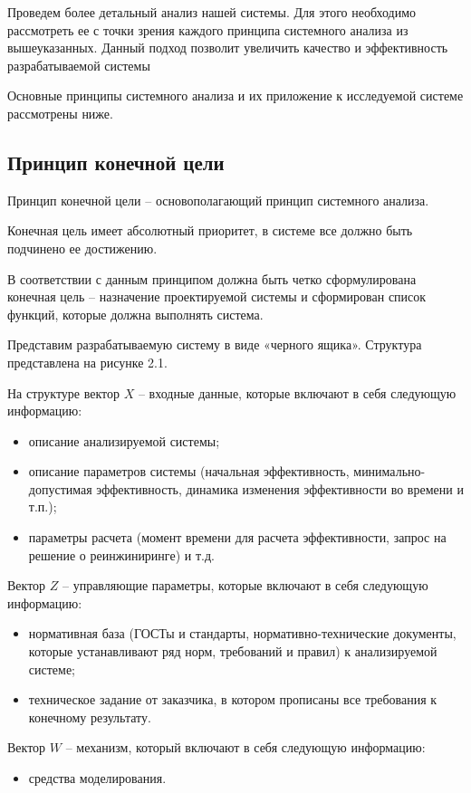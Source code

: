 Проведем более детальный анализ нашей системы. 
Для этого необходимо рассмотреть ее с точки зрения каждого принципа системного анализа из вышеуказанных. 
Данный подход позволит увеличить качество и эффективность разрабатываемой системы

Основные принципы системного анализа и их приложение к исследуемой системе рассмотрены ниже.

\subsection{Принцип конечной цели}
Принцип конечной цели – основополагающий принцип системного анализа.

Конечная цель имеет абсолютный приоритет, в системе все должно быть подчинено ее достижению. 

В соответствии с данным принципом должна быть четко сформулирована конечная цель – назначение проектируемой системы и сформирован список функций, которые должна выполнять система.

Представим разрабатываемую систему в виде «черного ящика». 
Структура представлена на рисунке 2.1.

На структуре вектор $X$ – входные данные, которые включают в себя следующую информацию:
\begin{itemize}
    \item описание анализируемой системы;
    \item описание параметров системы (начальная эффективность, минимально-допустимая эффективность, динамика изменения эффективности во времени и т.п.);
    \item параметры расчета (момент времени для расчета эффективности, запрос на решение о реинжиниринге) и т.д.
\end{itemize}

Вектор $Z$ – управляющие параметры, которые включают в себя следующую информацию:
\begin{itemize}
    \item нормативная база (ГОСТы и стандарты, нормативно-технические документы, которые устанавливают ряд норм, требований и правил) к анализируемой системе;
    \item техническое задание от заказчика, в котором прописаны все требования к конечному результату.
\end{itemize}
	
Вектор $W$ – механизм, который включают в себя следующую информацию:

\begin{itemize}
    \item средства моделирования.
\end{itemize}


